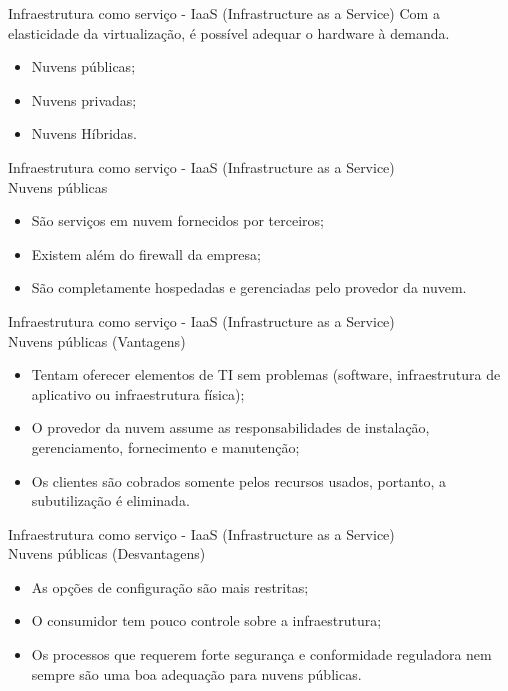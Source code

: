 \documentclass{beamer}
\begin{document}
\begin{frame}[fragile]{Infraestrutura como serviço - IaaS (Infrastructure as a Service)}\justifying
      Com a elasticidade da virtualização, é possível adequar o hardware à demanda.
      \begin{itemize}
            \item Nuvens públicas;
            \item Nuvens privadas;
            \item Nuvens Híbridas.
      \end{itemize}
\end{frame}
\begin{frame}[fragile]{Infraestrutura como serviço - IaaS (Infrastructure as a Service) \\ Nuvens públicas}\justifying
      \begin{itemize}
            \item São serviços em nuvem fornecidos por terceiros;
            \item Existem além do firewall da empresa;
            \item São completamente hospedadas e gerenciadas pelo provedor da nuvem.
      \end{itemize}
\end{frame}
\begin{frame}[fragile]{Infraestrutura como serviço - IaaS (Infrastructure as a Service) \\ Nuvens públicas (Vantagens)}\justifying
      \begin{itemize}
            \item Tentam oferecer elementos de TI sem problemas (software, infraestrutura de aplicativo ou infraestrutura física);
            \item O provedor da nuvem assume as responsabilidades de instalação, gerenciamento, fornecimento e manutenção;
            \item Os clientes são cobrados somente pelos recursos usados, portanto, a subutilização é eliminada.
      \end{itemize}
\end{frame}
\begin{frame}[fragile]{Infraestrutura como serviço - IaaS (Infrastructure as a Service) \\ Nuvens públicas (Desvantagens)}\justifying
      \begin{itemize}
            \item As opções de configuração são mais restritas;
            \item O consumidor tem pouco controle sobre a infraestrutura;
            \item Os processos que requerem forte segurança e conformidade reguladora nem sempre são uma boa adequação para nuvens públicas.
      \end{itemize}
\end{frame}
\end{document}
